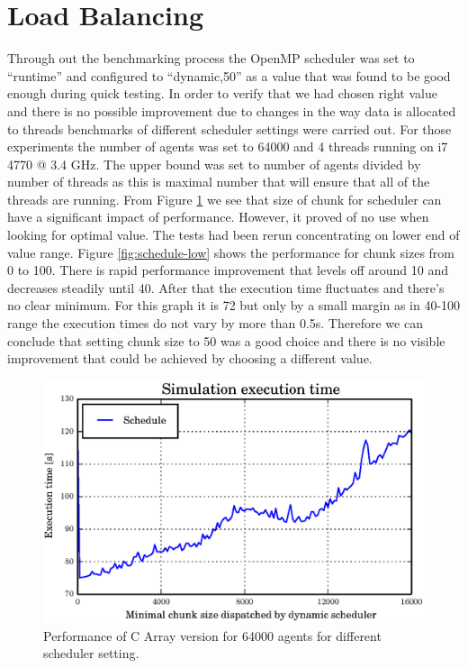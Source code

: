 \documentclass[12pt, a4paper]{report}
\begin{document}
\section{Load Balancing}\label{sec:eval-load-balance}
Through out the benchmarking process the OpenMP scheduler was set to ``runtime''
and configured to ``dynamic,50'' as a value that was found to be good enough
during quick testing. In order to verify that we had chosen right value
and there is no possible improvement due to changes in the way data is
allocated to threads benchmarks of different scheduler settings were carried
out. For those experiments the number of agents was set to 64000 and 4 threads
running on i7 4770 @ 3.4 GHz. The upper bound was set to number of agents
divided by number of threads as this is maximal number that will ensure that
all of the threads are running. From Figure \ref{fig:schedule-high} we see
that size of chunk for scheduler can have a significant impact of performance.
However, it proved of no use when looking for optimal value. The tests had
been rerun concentrating on lower end of value range. Figure \ref{fig:schedule-low}
shows the performance for chunk sizes from 0 to 100. There is rapid performance
improvement that levels off around 10 and decreases steadily until 40. After
that the execution time fluctuates and there's no clear minimum. For this
graph it is 72 but only by a small margin as in 40-100 range the execution
times do not vary by more than 0.5s. Therefore we can conclude that setting
chunk size to 50 was a good choice and there is no visible improvement that
could be achieved by choosing a different value.

\begin{figure}[H]
  \begin{center}
    \includegraphics[width=\columnwidth]{graphs/schedule-high.eps}
    \caption{Performance of C Array version for 64000 agents for different scheduler setting.}
    \label{fig:schedule-high}
  \end{center}
\end{figure}
\end{document}
